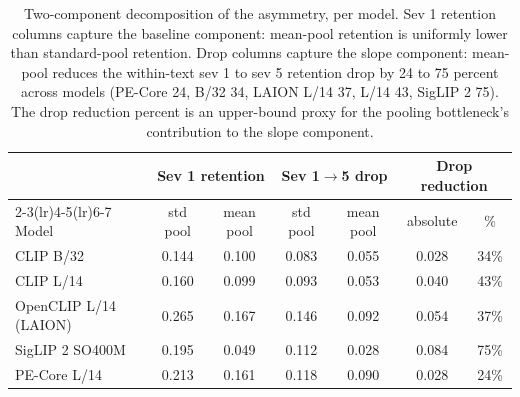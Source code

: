 \begin{table}[h]
\centering
\caption{Two-component decomposition of the asymmetry, per model. Sev 1 retention columns capture the baseline component: mean-pool retention is uniformly lower than standard-pool retention. Drop columns capture the slope component: mean-pool reduces the within-text sev 1 to sev 5 retention drop by 24 to 75 percent across models (PE-Core 24, B/32 34, LAION L/14 37, L/14 43, SigLIP 2 75). The drop reduction percent is an upper-bound proxy for the pooling bottleneck's contribution to the slope component.}
\label{tab:t5_pooling}
\footnotesize
\begin{tabular}{lcccccc}
\toprule
 & \multicolumn{2}{c}{Sev 1 retention} & \multicolumn{2}{c}{Sev 1$\to$5 drop} & \multicolumn{2}{c}{Drop reduction} \\
\cmidrule(lr){2-3}\cmidrule(lr){4-5}\cmidrule(lr){6-7}
Model & std pool & mean pool & std pool & mean pool & absolute & \% \\
\midrule
CLIP B/32 & 0.144 & 0.100 & 0.083 & 0.055 & 0.028 & 34\% \\
CLIP L/14 & 0.160 & 0.099 & 0.093 & 0.053 & 0.040 & 43\% \\
OpenCLIP L/14 (LAION) & 0.265 & 0.167 & 0.146 & 0.092 & 0.054 & 37\% \\
SigLIP 2 SO400M & 0.195 & 0.049 & 0.112 & 0.028 & 0.084 & 75\% \\
PE-Core L/14 & 0.213 & 0.161 & 0.118 & 0.090 & 0.028 & 24\% \\
\bottomrule
\end{tabular}
\end{table}
